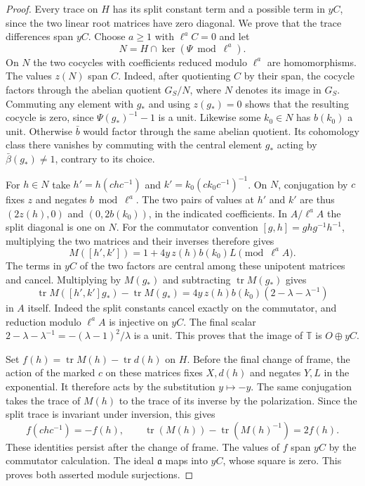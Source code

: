 \documentclass[a4paper,11pt]{article}
\theoremstyle{definition}
\theoremstyle{remark}
\numberwithin{equation}{section}
\begin{document}
\begin{proof}
Every trace on \(H\) has its split constant term and a possible
term in \(yC\), since the two linear root matrices have zero
diagonal. We prove that the trace differences span \(yC\).
Choose \(a\ge1\) with \(\ell^aC=0\) and let
\[
         N=H\cap\ker(\Psi\bmod\ell^a).
\]
On \(N\) the two cocycles with coefficients reduced modulo
\(\ell^a\) are homomorphisms. The values \(z(N)\) span \(C\).
Indeed, after quotienting \(C\) by their span, the cocycle
factors through the abelian quotient \(G_S/N\), where \(N\)
denotes its image in \(G_S\). Commuting any element with \(g_*\)
and using \(z(g_*)=0\) shows that the resulting cocycle is zero,
since \(\Psi(g_*)^{-1}-1\) is a unit. Likewise some \(k_0\in N\)
has \(b(k_0)\) a unit. Otherwise \(\bar b\) would factor through
the same abelian quotient. Its cohomology class there vanishes
by commuting with the central element \(g_*\) acting by
\(\bar\beta(g_*)\ne1\), contrary to its choice.

For \(h\in N\) take \(h'=h(chc^{-1})\) and
\(k'=k_0(ck_0c^{-1})^{-1}\). On \(N\), conjugation by \(c\)
fixes \(z\) and negates \(b\bmod\ell^a\). The two pairs of
values at \(h'\) and \(k'\) are thus \((2z(h),0)\) and
\((0,2b(k_0))\), in the indicated coefficients. In \(A/\ell^aA\)
the split diagonal is one on \(N\). For the commutator convention
\([g,h]=ghg^{-1}h^{-1}\), multiplying the two matrices and their
inverses therefore gives
\[
 M([h',k'])=1+4y\,z(h)b(k_0)L\pmod{\ell^a A}.
\]
The terms in \(yC\) of the two factors are central among these
unipotent matrices and cancel. Multiplying by \(M(g_*)\) and
subtracting \(\operatorname{tr}M(g_*)\) gives
\[
 \operatorname{tr}M([h',k']g_*)-\operatorname{tr}M(g_*)
        =4y\,z(h)b(k_0)(2-\lambda-\lambda^{-1})
\]
in \(A\) itself. Indeed the split constants cancel exactly
on the commutator, and reduction modulo \(\ell^a A\) is
injective on \(yC\). The final scalar \(2-\lambda-\lambda^{-1}
=-(\lambda-1)^2/\lambda\) is a unit. This proves that the
image of \(\mathbb T\) is \(O\oplus yC\).

Set \(f(h)=\operatorname{tr}M(h)-\operatorname{tr}d(h)\) on \(H\).
Before the final change of frame, the action of the marked \(c\)
on these matrices fixes \(X,d(h)\) and negates \(Y,L\) in the
exponential. It therefore acts by the substitution \(y\mapsto-y\).
The same conjugation takes the trace of \(M(h)\) to the trace of
its inverse by the polarization. Since the split trace is invariant
under inversion, this gives
\[
       f(chc^{-1})=-f(h),\qquad
       \operatorname{tr}(M(h))-\operatorname{tr}(M(h)^{-1})=2f(h).
\]
These identities persist after the change of frame. The values
of \(f\) span \(yC\) by the commutator calculation. The ideal
\(\mathfrak a\) maps into \(yC\), whose square is zero. This
proves both asserted module surjections.


\end{proof}
\end{document}
